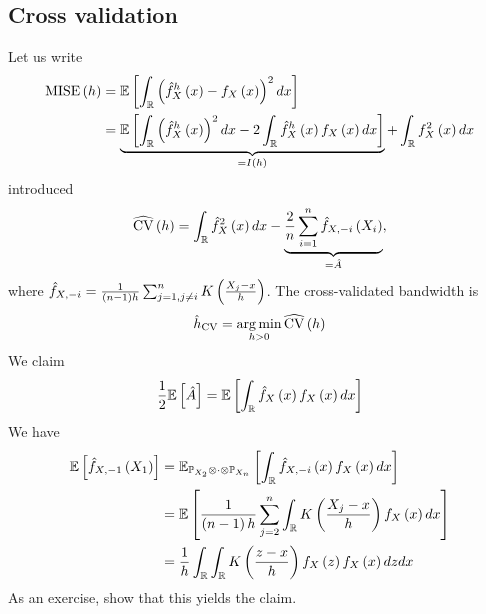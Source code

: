 \subsection{Cross validation}
Let us write
\begin{equation*}
	\begin{split}
		\mathrm{MISE}\left(h\right) & = \mathbb{E}\left[\int_{\mathbb{R}} \left(\hat{f}^h_X\left(x\right)-f_X\left(x\right) \right)^2dx\right]                                                                                  \\
		                    & = \underbrace{\mathbb{E}\left[\int_{\mathbb{R}} \left(\hat{f}^h_X \left(x\right)\right)^2 dx - 2\int_{\mathbb{R}} \hat{f}^h_X\left(x\right) f_X\left(x\right)dx \right]}_{=I\left(h\right)} + \int_{\mathbb{R}} f_X^2\left(x\right)dx
	\end{split}
\end{equation*}
introduced
\begin{equation*}
	\widehat{\mathrm{CV}}\left(h\right) = \int_{\mathbb{R}} \hat{f}_X^2 \left(x\right)dx - \underbrace{\frac{2}{n} \sum_{i=1}^n \hat{f}_{X,-i}\left(X_i\right)}_{=\hat{A}},
\end{equation*}
where $\hat{f}_{X,-i} = \frac{1}{\left(n-1\right)h} \sum_{j=1,j\neq i}^n K\left(\frac{X_j-x}{h}\right)$. The cross-validated bandwidth is
\begin{equation*}
	\hat{h}_{\mathrm{CV}} = \operatorname*{arg\,min}_{h>0 }\widehat{\mathrm{CV}}\left(h\right)
\end{equation*}
We claim
\begin{equation*}
	\frac{1}{2}\mathbb{E}\left[\hat{A}\right]= \mathbb{E}\left[\int_{\mathbb{R}} \hat{f}_X\left(x\right) f_X\left(x\right) dx\right]
\end{equation*}
We have
\begin{equation*}
	\begin{split}
		\mathbb{E}\left[\hat{f}_{X,-1}\left(X_1\right)\right] & = \mathbb{E}_{\mathbb{P}_{X_2}\otimes  \cdot\otimes \mathbb{P}_{X_n}}\left[\int_{\mathbb{R}} \hat{f}_{X,-i}\left(x\right)f_X\left(x\right) dx\right] \\
		                               & = \mathbb{E}\left[\frac{1}{\left(n-1\right) h}\sum_{j=2}^n \int_{\mathbb{R}} K\left(\frac{X_j-x}{h}\right)f_X\left(x\right) dx\right]        \\
		                               & =\frac{1}{h} \int_{\mathbb{R}}\int_{\mathbb{R}} K\left(\frac{z-x}{h}\right) f_X\left(z\right) f_X\left(x\right) dz dx
	\end{split}
\end{equation*}
As an exercise, show that this yields the claim.

